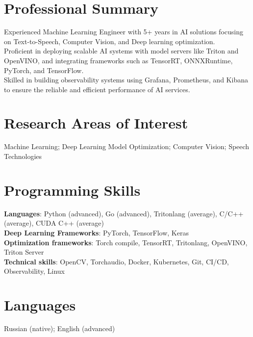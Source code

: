 \section{\sc Professional Summary}
Experienced Machine Learning Engineer with 5+ years in AI solutions focusing on Text-to-Speech, Computer Vision, and Deep learning optimization. \\
Proficient in deploying scalable AI systems with model servers like Triton and OpenVINO, and integrating frameworks such as TensorRT, ONNXRuntime, PyTorch, and TensorFlow. \\
Skilled in building observability systems using Grafana, Prometheus, and Kibana to ensure the reliable and efficient performance of AI services.

\section{\sc Research Areas of Interest}
{Machine Learning; Deep Learning Model Optimization; Computer Vision; Speech Technologies}

\section{\sc Programming Skills}
\textbf{Languages}: Python (advanced), Go (advanced), Tritonlang (average), C/C++ (average), CUDA C++ (average) \\
\textbf{Deep Learning Frameworks}: PyTorch, TensorFlow, Keras \\
\textbf{Optimization frameworks}: Torch compile, TensorRT, Tritonlang, OpenVINO, Triton Server \\
\textbf{Technical skills}: OpenCV, Torchaudio, Docker, Kubernetes, Git, CI/CD, Observability, Linux

\section{\sc Languages}
{Russian (native); English (advanced)}

\endinput
